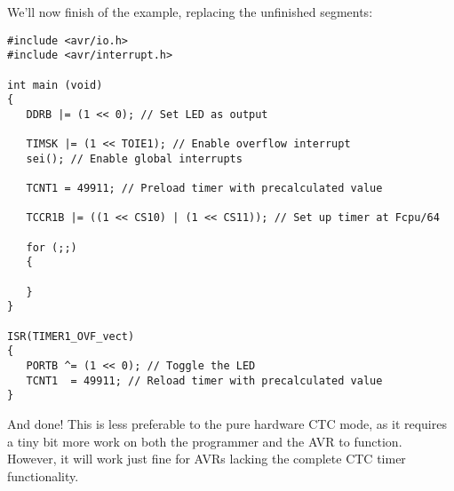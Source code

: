 \documentclass[a4paper,oneside,notitlepage]{book}
\begin{document}
We'll now finish of the example, replacing the unfinished segments:

\begin{center}
\begin{lstlisting}
#include <avr/io.h>
#include <avr/interrupt.h>

int main (void)
{
   DDRB |= (1 << 0); // Set LED as output

   TIMSK |= (1 << TOIE1); // Enable overflow interrupt
   sei(); // Enable global interrupts

   TCNT1 = 49911; // Preload timer with precalculated value

   TCCR1B |= ((1 << CS10) | (1 << CS11)); // Set up timer at Fcpu/64

   for (;;)
   {

   }
}

ISR(TIMER1_OVF_vect)
{
   PORTB ^= (1 << 0); // Toggle the LED
   TCNT1  = 49911; // Reload timer with precalculated value
} 
\end{lstlisting}
\end{center}

And done! This is less preferable to the pure hardware CTC mode, as it requires a tiny bit more work on both the programmer and the AVR to function. However, it will work just fine for AVRs lacking the complete CTC timer functionality.
\end{document}
